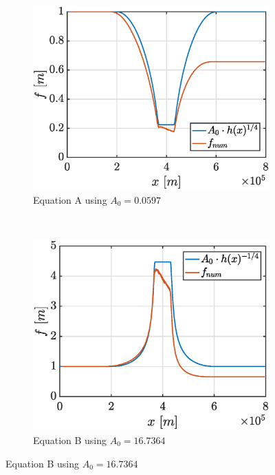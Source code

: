 \documentclass[a4paper,12pt,twoside]{article}
\begin{document}
      \begin{figure}[h]
        \centering
        \begin{subfigure}{0.45\textwidth}
          \centering
          \includegraphics[width=\textwidth]{graphs/tsunami_amp_A.eps}
          \caption{Equation A using $A_0 = \num{0.0597}$}
          \label{fig:tsunami-amp-A}
        \end{subfigure}
        ~
        \begin{subfigure}{0.45\textwidth}
          \centering
          \includegraphics[width=\textwidth]{graphs/tsunami_amp_B.eps}
          \caption{Equation B using $A_0 = \num{16.7364}$}

\end{subfigure}
\end{figure}
\end{document}
